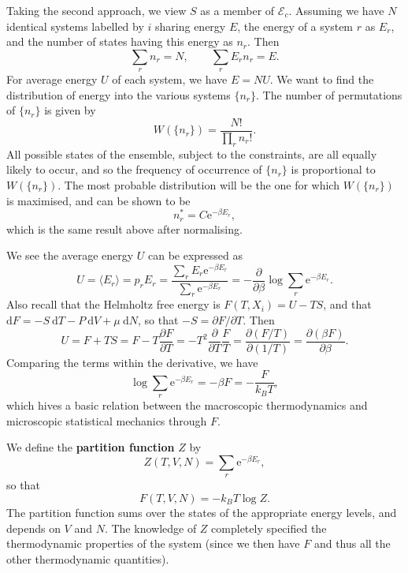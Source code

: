 \documentclass[letter-paper]{tufte-book}
\newcommand{\ex}{\mathrm{e}}
\newcommand\Def[1]{\textbf{#1}}
\begin{document}
Taking the second approach, we view $S$ as a member of $\mathcal{E}_c$. Assuming
we have $N$ identical systems labelled by $i$ sharing energy $E$, the energy of
a system $r$ as $E_r$, and the number of states having this energy as $n_r$.
Then
\begin{equation*}
  \sum_r n_r = N, \qquad \sum_r E_r n_r = E.
\end{equation*}
For average energy $U$ of each system, we have $E = NU$. We want to find the
distribution of energy into the various systems $\{n_r\}$. The number of
permutations of $\{n_r\}$ is given by
\begin{equation*}
  W(\{n_r\}) = \frac{N!}{\prod_r n_r !}.
\end{equation*}
All possible states of the ensemble, subject to the constraints, are all equally
likely to occur, and so the frequency of occurrence of $\{n_r\}$ is proportional
to $W(\{n_r\})$. The most probable distribution will be the one for which
$W(\{n_r\})$ is maximised, and can be shown to be
\begin{equation*}
  n_r^* = C\ex^{-\beta E_r},
\end{equation*}
which is the same result above after normalising.

We see the average energy $U$ can be expressed as
\begin{equation*}
  U = \langle E_r \rangle = p_r E_r = \frac{\sum_r E_r \mathrm{e}^{-\beta E_r}}{\sum_r \mathrm{e}^{-\beta E_r}} = -\frac{\partial}{\partial \beta} \log \sum_r \mathrm{e}^{-\beta E_r}.
\end{equation*}
Also recall that the Helmholtz free energy is $F(T, X_i) = U - TS$, and that
$\mathrm{d}F = -S\ \mathrm{d}T - P\ \mathrm{d}V + \mu\ \mathrm{d}N$, so that $-S
= \partial F / \partial T$. Then
\begin{equation*}
  U = F + TS = F - T\frac{\partial F}{\partial T} = -T^2 \frac{\partial}{\partial T} \frac{F}{T} = \frac{\partial (F/T)}{\partial (1/T)} = \frac{\partial (\beta F)}{\partial \beta}.
\end{equation*}
Comparing the terms within the derivative, we have
\begin{equation}
  \log \sum_r \mathrm{e}^{-\beta E_r} = -\beta F = -\frac{F}{k_B T},
\end{equation}
which hives a basic relation between the macroscopic thermodynamics and
microscopic statistical mechanics through $F$.

We define the \Def{partition function} $Z$ by
\begin{equation}
  Z(T, V, N) = \sum_r \mathrm{e}^{-\beta E_r},
\end{equation}
so that
\begin{equation}
  F(T, V, N) = -k_B T \log Z.
\end{equation}
The partition function sums over the states of the appropriate energy levels,
and depends on $V$ and $N$. The knowledge of $Z$ completely specified the
thermodynamic properties of the system (since we then have $F$ and thus all the
other thermodynamic quantities).
\end{document}
